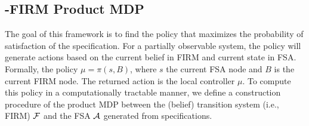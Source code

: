 \documentclass[conference]{IEEEtran}
\begin{document}

\subsection{\DTL-FIRM Product MDP}
\label{sec:DTL-FIRM}
The goal of this framework is to find the policy that maximizes the probability of satisfaction of the \DTL specification. For a partially observable system, the policy will generate actions based on the current belief in FIRM and current state in FSA. Formally, the policy $\mu=\pi(s,B)$, where $s$ the current FSA node and $B$ is the current FIRM node. The returned action is the local controller $\mu$.
To compute this policy in a computationally tractable manner, we define a construction procedure of the product MDP between the (belief) transition system (i.e., FIRM) $\mathcal{F}$ and the FSA $\mathcal{A}$ generated from specifications.
\end{document}
